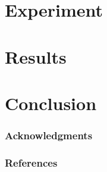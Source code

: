 \documentclass{article} %
\begin{document}
\section{Experiment}

\section{Results}

\section*{Conclusion}

\subsubsection*{Acknowledgments}

\subsubsection*{References}
\end{document}
